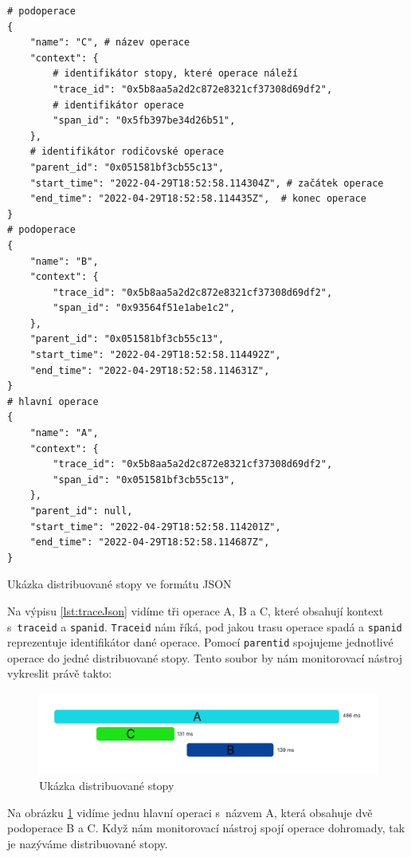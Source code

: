 \begin{listing}[H]
    \begin{verbatim}
# podoperace 
{   
    "name": "C", # název operace 
    "context": {
        # identifikátor stopy, které operace náleží 
        "trace_id": "0x5b8aa5a2d2c872e8321cf37308d69df2",
        # identifikátor operace 
        "span_id": "0x5fb397be34d26b51",
    },
    # identifikátor rodičovské operace 
    "parent_id": "0x051581bf3cb55c13",
    "start_time": "2022-04-29T18:52:58.114304Z", # začátek operace 
    "end_time": "2022-04-29T18:52:58.114435Z",  # konec operace 
}
# podoperace 
{   
    "name": "B",
    "context": {
        "trace_id": "0x5b8aa5a2d2c872e8321cf37308d69df2",
        "span_id": "0x93564f51e1abe1c2",
    },
    "parent_id": "0x051581bf3cb55c13",
    "start_time": "2022-04-29T18:52:58.114492Z",
    "end_time": "2022-04-29T18:52:58.114631Z",
}
# hlavní operace 
{   
    "name": "A",
    "context": {
        "trace_id": "0x5b8aa5a2d2c872e8321cf37308d69df2",
        "span_id": "0x051581bf3cb55c13",
    },
    "parent_id": null,
    "start_time": "2022-04-29T18:52:58.114201Z",
    "end_time": "2022-04-29T18:52:58.114687Z",
}
\end{verbatim}
    \caption{Ukázka distribuované stopy ve formátu JSON}
    \label{lst:traceJson}
\end{listing}

Na výpisu \ref{lst:traceJson} vidíme tři operace A, B a C, které obsahují kontext s~\texttt{trace\textunderscore id} a \texttt{span\textunderscore id}. \texttt{Trace\textunderscore id} nám říká, pod jakou trasu operace spadá a \texttt{span\textunderscore id} reprezentuje identifikátor dané operace. Pomocí \texttt{parent\textunderscore id} spojujeme jednotlivé operace do jedné distribuované stopy. Tento soubor by nám monitorovací nástroj vykreslit právě takto:


\begin{figure}[H]
  \centering
  \includegraphics[width=15cm]{obrazky-figures/distributed_trace.png}
  \caption{Ukázka distribuované stopy}
  \label{fig:trace}
\end{figure}
Na obrázku \ref{fig:trace} vidíme jednu hlavní operaci s~názvem A, která obsahuje dvě podoperace B a C. Když nám monitorovací nástroj spojí operace dohromady, tak je nazýváme distribuované stopy.


